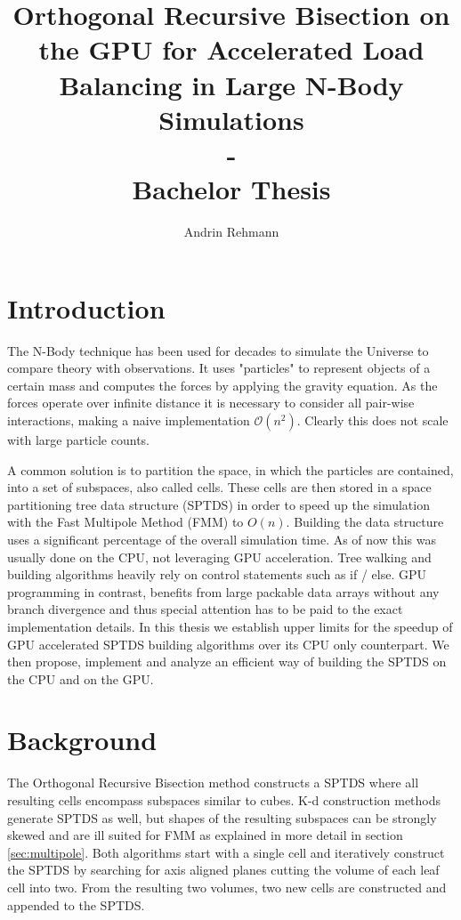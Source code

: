\documentclass[]{article}
\title{Orthogonal Recursive Bisection on the GPU for Accelerated Load Balancing in Large N-Body Simulations \\ - \\ Bachelor Thesis}
\author{Andrin Rehmann}
\begin{document}
\maketitle

\newpage

\tableofcontents

\newpage
\section{Introduction}


The N-Body technique has been used for decades to simulate the Universe to compare theory with observations. It uses "particles" to represent objects of a certain mass and computes the forces by applying the gravity equation. As the forces operate over infinite distance it is necessary to consider all pair-wise interactions, making a naive implementation $\mathcal{O}(n^2)$. Clearly this does not scale with large particle counts.

A common solution is to partition the space, in which the particles are contained, into a set of subspaces, also called cells. These cells are then stored in a space partitioning tree data structure (SPTDS) in order to speed up the simulation with the Fast Multipole Method (FMM) to $O(n)$. 
Building the data structure uses a significant percentage of the overall simulation time. As of now this was usually done on the CPU, not leveraging GPU acceleration. Tree walking and building algorithms heavily rely on control statements such as if / else. GPU programming in contrast, benefits from large packable data arrays without any branch divergence and thus special attention has to be paid to the exact implementation details. 
In this thesis we establish upper limits for the speedup of GPU accelerated SPTDS building algorithms over its CPU only counterpart. We then propose, implement and analyze an efficient way of building the SPTDS on the CPU and on the GPU. 



\newpage
\section{Background}

The Orthogonal Recursive Bisection method constructs a SPTDS where all resulting cells encompass subspaces similar to cubes. K-d construction methods generate SPTDS as well, but shapes of the resulting subspaces can be strongly skewed and are ill suited for FMM as explained in more detail in section \ref{sec:multipole}. Both algorithms start with a single cell and iteratively construct the SPTDS by searching for axis aligned planes cutting the volume of each leaf cell into two. From the resulting two volumes, two new cells are constructed and appended to the SPTDS. 
\end{document}
